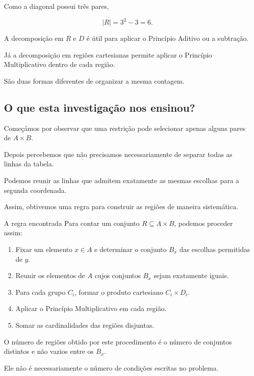 \documentclass[11pt,a4paper,oneside]{book}
\newcommand{\card}[1]{\lvert #1\rvert}
\begin{document}
Como a diagonal possui três pares,

\[
\card R=3^2-3=6.
\]

A decomposição em $R$ e $D$
é útil para aplicar o
Princípio Aditivo ou a subtração.

Já a decomposição em regiões
cartesianas permite aplicar
o Princípio Multiplicativo
dentro de cada região.

São duas formas diferentes
de organizar a mesma contagem.

\subsection*{O que esta investigação nos ensinou?}

Começámos por observar que
uma restrição pode selecionar
apenas alguns pares de $A\times B$.

Depois percebemos que não
precisamos necessariamente
de separar todas as linhas
da tabela.

Podemos reunir as linhas
que admitem exatamente
as mesmas escolhas para
a segunda coordenada.

Assim, obtivemos uma regra
para construir as regiões
de maneira sistemática.

\begin{descobertabox}{A regra encontrada}
Para contar um conjunto
$R\subseteq A\times B$,
podemos proceder assim:

\begin{enumerate}
\item Fixar um elemento $x\in A$
e determinar o conjunto $B_x$
das escolhas permitidas de $y$.

\item Reunir os elementos de $A$
cujos conjuntos $B_x$
sejam exatamente iguais.

\item Para cada grupo $C_i$,
formar o produto cartesiano
$C_i\times D_i$.

\item Aplicar o Princípio
Multiplicativo em cada região.

\item Somar as cardinalidades
das regiões disjuntas.
\end{enumerate}

O número de regiões obtido
por este procedimento é
o número de conjuntos distintos
e não vazios entre os $B_x$.

Ele não é necessariamente
o número de condições
escritas no problema.
\end{descobertabox}
\end{document}

